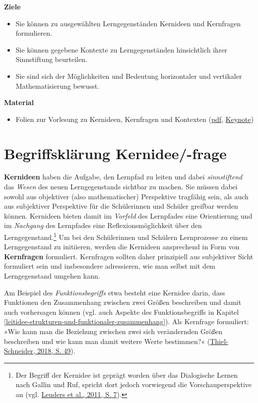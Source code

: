 \documentclass[
]{scrbook}
\providecommand{\tightlist}{%
  \setlength{\itemsep}{0pt}\setlength{\parskip}{0pt}}
\renewenvironment{quote}{
  \list{}{
	\leftmargin0.2cm   %
    \rightmargin\leftmargin
      	\def\FrameCommand
    {%
        {\color{quoteColor}\vrule width 2pt}%
        \hspace{0pt}%
    }%
    \MakeFramed{\advance \hsize -\width \FrameRestore}    \color{quoteColor}
    }
  \item\relax
}
{\endlist\color{black}\endMakeFramed}
\theoremstyle{definition}
\theoremstyle{definition}
\theoremstyle{definition}
\theoremstyle{definition}
\theoremstyle{remark}
\begin{document}
\begin{quote}
\textbf{Ziele}

\begin{itemize}
\tightlist
\item
  Sie können zu ausgewählten Lerngegenständen Kernideen und Kernfragen formulieren.
\item
  Sie können gegebene Kontexte zu Lerngegenständen hinsichtlich ihrer Sinnstiftung beurteilen.
\item
  Sie sind sich der Möglichkeiten und Bedeutung horizontaler und vertikaler Mathematisierung bewusst.
\end{itemize}

\textbf{Material}

\begin{itemize}
\tightlist
\item
  Folien zur Vorlesung zu Kernideen, Kernfragen und Kontexten (\href{files/Stoffdidaktik-WiSe2223-Kap4.pdf}{pdf}, \href{files/Stoffdidaktik-WiSe2223-Kap4.key}{Keynote})
\end{itemize}
\end{quote}

\hypertarget{kernidee-begriffsklaerung}{%
\section{Begriffsklärung Kernidee/-frage}\label{kernidee-begriffsklaerung}}

\textbf{Kernideen} haben die Aufgabe, den Lernpfad zu leiten und dabei \emph{sinnstiftend} das \emph{Wesen} des neuen Lerngegenstands sichtbar zu machen. Sie müssen dabei sowohl aus objektiver (also mathematischer) Perspektive tragfähig sein, als auch aus subjektiver Perspektive für die Schülerinnen und Schüler greifbar werden können. Kernideen bieten damit im \emph{Vorfeld} des Lernpfades eine Orientierung und im \emph{Nachgang} des Lernpfades eine Reflexionsmöglichkeit über den Lerngegenstand.\footnote{Der Begriff der Kernidee ist geprägt worden über das Dialogische Lernen nach Gallin und Ruf, spricht dort jedoch vorwiegend die Vorschauperspektive an (vgl. \protect\hyperlink{ref-Leuders2011}{Leuders et al., 2011, S. 7}).} Um bei den Schülerinnen und Schülern Lernprozesse zu einem Lerngegenstand zu initiieren, werden die Kernideen ansprechend in Form von \textbf{Kernfragen} formuliert. Kernfragen sollten daher prinzipiell aus subjektiver Sicht formuliert sein und insbesondere adressieren, wie man selbst mit dem Lerngegenstand umgehen kann.

Am Beispiel des \emph{Funktionsbegriffs} etwa besteht eine Kernidee darin, dass Funktionen den Zusammenhang zwischen zwei Größen beschreiben und damit auch vorhersagen können (vgl. auch Aspekte des Funktionsbegriffs in Kapitel \ref{leitidee-strukturen-und-funktionaler-zusammenhang}). Als Kernfrage formuliert: »Wie kann man die Beziehung zwischen zwei sich verändernden Größen beschreiben und wie kann man damit weitere Werte bestimmen?« (\protect\hyperlink{ref-Thiel-Schneider2018}{Thiel-Schneider, 2018, S. 49}).
\end{document}
